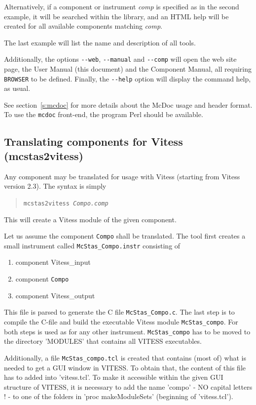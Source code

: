 Alternatively, if a component or instrument {\it comp} is specified as in the second example, it will be searched within the library, and an HTML help will be created for all available components matching {\it comp}.

The last example will list the name and description of all \MCS tools.

Additionally, the options \verb+--web+, \verb+--manual+ and \verb+--comp+ will open the \MCS web site page, the User Manual (this document) and the Component Manual, all requiring \verb+BROWSER+ to be defined. Finally, the \verb+--help+ option will display the command help, as usual.

See section~\ref{s:mcdoc} for more details about the McDoc usage and header format.
To use the \verb+mcdoc+ front-end, the program Perl should be available.

\subsection{Translating \MCS components for Vitess (mcstas2vitess)}
\label{s:mcstas2vitess}

Any \MCS component may be translated for usage with Vitess (starting from Vitess version 2.3). The syntax is simply 
\begin{quote}
  \texttt{mcstas2vitess {\it Compo.comp\/}}
\end{quote}
This will create a Vitess module of the given component.

Let us assume the component \verb+Compo+ shall be translated. The tool first creates a small instrument called \verb+McStas_Compo.instr+ consisting of
\begin{enumerate}
\item component Vitess\_input
\item component \verb+Compo+
\item component Vitess\_output
\end{enumerate}

This file is parsed to generate the C file \verb+McStas_Compo.c+. The last step is to compile the C-file and build the executable Vitess module \verb'McStas_compo'. For both steps \MCS is used as for any other instrument. \verb'McStas_compo' has to be moved to the directory 'MODULES' that contains all VITESS executables.

Additionally, a file \verb'McStas_compo.tcl' is created that contains (most of) what is needed to get a GUI window in VITESS. To obtain that, the content of this file has to added into 'vitess.tcl'. To make it accessible within the given GUI structure of VITESS, it is necessary to add the name 'compo' - NO capital letters ! - to one of the folders in 'proc makeModuleSets{}' (beginning of 'vitess.tcl').

